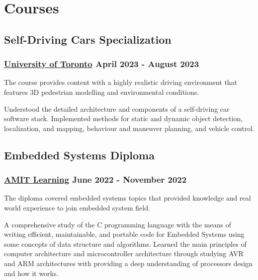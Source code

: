 \section*{Courses}
%
%
%
%
%
%
\subsection*{Self-Driving Cars Specialization}
\subsubsection*{
  \href{https://www.coursera.org/specializations/self-driving-cars}{University of Toronto}
  \hspace*{\fill}
  April 2023 - August 2023
}
The course provides content with a highly realistic driving environment that
features 3D pedestrian modelling and environmental conditions.
\vspace{2mm}
\begin{tasks}
  \task Understood the detailed architecture and components of a self-driving
  car software stack.
  \task Implemented methods for static and dynamic object detection, localization,
  and mapping, behaviour and maneuver planning, and vehicle control.
\end{tasks}
%
%
%
%
\subsection*{Embedded Systems Diploma}
\subsubsection*{
  \href{https://amit-learning.com/}{AMIT Learning}
  \hspace*{\fill}
  June 2022 - November 2022
}
The diploma covered embedded systems topics that provided knowledge and real
world experience to join embedded system field.
\vspace{2mm}
\begin{tasks}
  \task A comprehensive study of the C programming language with the means of writing efficient,
  maintainable, and portable code for Embedded Systems using some concepts of data structure
  and algorithms.
  \task Learned the main principles of computer architecture and microcontroller architecture
  through studying AVR and ARM architectures with providing a deep understanding of processors
  design and how it works.
\end{tasks}